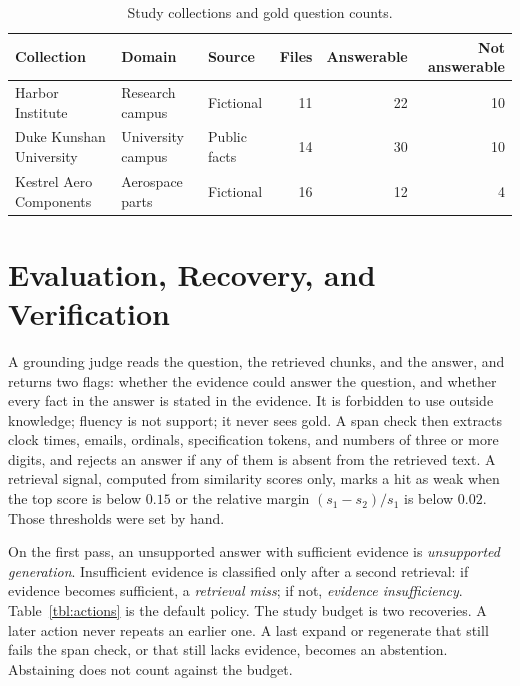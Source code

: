 \documentclass[12pt, a4paper, oneside]{report}
\begin{document}
\begin{table}[htbp]
\centering
\footnotesize
\setlength{\tabcolsep}{5pt}
\begin{tabular}{@{}lllrrr@{}}
\toprule
Collection & Domain & Source & Files & Answerable & Not answerable \\
\midrule
Harbor Institute & Research campus & Fictional & 11 & 22 & 10 \\
Duke Kunshan University & University campus & Public facts & 14 & 30 & 10 \\
Kestrel Aero Components & Aerospace parts & Fictional & 16 & 12 & 4 \\
\bottomrule
\end{tabular}
\caption{Study collections and gold question counts.}
\label{tbl:corpora}
\end{table}

\section{Evaluation, Recovery, and Verification}

A grounding judge reads the question, the retrieved chunks, and the
answer, and returns two flags: whether the evidence could answer the
question, and whether every fact in the answer is stated in the evidence.
It is forbidden to use outside knowledge; fluency is not support; it never
sees gold. A span check then extracts clock times, emails, ordinals,
specification tokens, and numbers of three or more digits, and rejects an
answer if any of them is absent from the retrieved text. A retrieval
signal, computed from similarity scores only, marks a hit as weak when
the top score is below $0.15$ or the relative margin
$(s_1-s_2)/s_1$ is below $0.02$. Those thresholds were set by hand.

On the first pass, an unsupported answer with sufficient evidence is
\emph{unsupported generation}. Insufficient evidence is classified only
after a second retrieval: if evidence becomes sufficient, a
\emph{retrieval miss}; if not, \emph{evidence insufficiency}.
Table~\ref{tbl:actions} is the default policy. The study budget is two
recoveries. A later action never repeats an earlier one. A last expand or
regenerate that still fails the span check, or that still lacks evidence,
becomes an abstention. Abstaining does not count against the budget.
\end{document}
